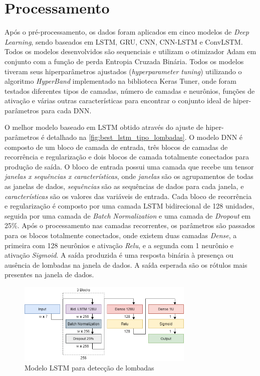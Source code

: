 \section{Processamento}

Após o pré-processamento, os dados foram aplicados em cinco modelos de \textit{Deep Learning}, sendo baseados em LSTM, GRU, CNN, CNN-LSTM e ConvLSTM. Todos os modelos desenvolvidos são sequenciais e utilizam o otimizador Adam em conjunto com a função de perda Entropia Cruzada Binária. Todos os modelos tiveram seus hiperparâmetros ajustados (\textit{hyperparameter tuning}) utilizando o algoritmo \textit{HyperBand} implementado na biblioteca Keras Tuner, onde foram testados diferentes tipos de camadas, número de camadas e neurônios, funções de ativação e várias outras características para encontrar o conjunto ideal de hiper-parâmetros para cada DNN. 

O melhor modelo baseado em LSTM obtido através do ajuste de hiper-parâmetros é detalhado na \autoref{fig:best_lstm_tipo_lombadas}. O modelo DNN é composto de um bloco de camada de entrada, três blocos de camadas de recorrência e regularização e dois blocos de camada totalmente conectados para produção de saída. O bloco de entrada possui uma camada que recebe um tensor \emph{janelas x sequências x características}, onde \emph{janelas} são os agrupamentos de todas as janelas de dados, \emph{sequências} são as sequências de dados para cada janela, e \emph{características} são os valores das variáveis de entrada. Cada bloco de recorrência e regularização é composto por uma camada LSTM bidirecional de 128 unidades, seguida por uma camada de \textit{Batch Normalization} e uma camada de \textit{Dropout} em 25\%. Após o processamento nas camadas recorrentes, os parâmetros são passados para os blocos totalmente conectados, onde existem duas camadas \textit{Dense}, a primeira com 128 neurônios e ativação \textit{Relu}, e a segunda com 1 neurônio e ativação \textit{Sigmoid}. A saída produzida é uma resposta binária à presença ou ausência de lombadas na janela de dados. A saída esperada são os rótulos mais presentes na janela de dados.

\begin{figure}[h!]
  \centering
  \caption{Modelo LSTM para detecção de lombadas}
  \label{fig:best_lstm_tipo_lombadas}
  \includegraphics[width=0.75\textwidth]{figuras/fig_40.png}
\end{figure}

